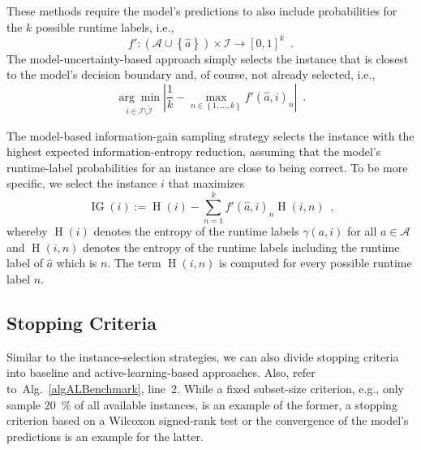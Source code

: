 \documentclass[runningheads]{llncs}
\begin{document}
These methods require the model's predictions to also include probabilities for the $k$ possible runtime labels, i.e., 
\begin{equation}
  f'\!: \left(\mathcal{A} \cup \left\lbrace \hat{a} \right\rbrace\right) \times \mathcal{I} \rightarrow \left[0, 1\right]^k  \enspace \textrm{.}
\end{equation}
The model-uncertainty-based approach simply selects the instance that is closest to the model's decision boundary and, of course, not already selected, i.e.,
\begin{equation}
  \underset{i \in \mathcal{I} \setminus \tilde{\mathcal{I}}}{\arg\min} \left\lvert \frac{1}{k} - \max_{n \in \left\lbrace 1, \dots, k \right\rbrace} f'\!\left(\hat{a}, i\right)_{n} \right\rvert \enspace \textrm{.}
\end{equation}

The model-based information-gain sampling strategy selects the instance with the highest expected information-entropy reduction, assuming that the model's runtime-label probabilities for an instance are close to being correct.
To be more specific, we select the instance $i$ that maximizes
\begin{equation}
  \operatorname{IG}\!\left(i\right) := \operatorname{H}\!\left(i\right) - \sum_{n = 1}^{k} f'\!\left(\hat{a}, i\right)_{n} \operatorname{H}\!\left(i, n\right) \enspace \textrm{,}
\end{equation}
whereby $\operatorname{H}\!\left(i\right)$ denotes the entropy of the runtime labels $\gamma\!\left(a, i\right)$ for all $a \in \mathcal{A}$ and $\operatorname{H}\!\left(i, n\right)$ denotes the entropy of the runtime labels including the runtime label of $\hat{a}$ which is $n$.
The term $\operatorname{H}\!\left(i, n\right)$ is computed for every possible runtime label $n$.


\subsection{Stopping Criteria}
\label{sec:main3}
Similar to the instance-selection strategies, we can also divide stopping criteria into baseline and active-learning-based approaches.
Also, refer to~Alg.~\ref{algALBenchmark}, line~2.
While a fixed subset-size criterion, e.g., only sample \SI{20}{\%} of all available instances, is an example of the former, a stopping criterion based on a Wilcoxon signed-rank test or the convergence of the model's predictions is an example for the latter.
\end{document}
